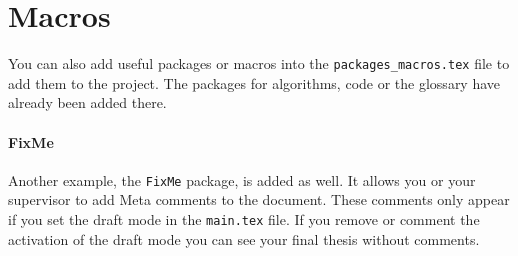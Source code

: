 \chapter{Macros}

You can also add useful packages or macros into the \verb|packages_macros.tex| file to add them to the project.
The packages for algorithms, code or the glossary have already been added there.

\subsubsection{FixMe}
Another example, the \verb|FixMe| package, is added as well. It allows you or your supervisor to add Meta comments to the document. These comments only appear if you set the draft mode in the \verb|main.tex| file. If you remove or comment the activation of the draft mode you can see your final thesis without comments. 
